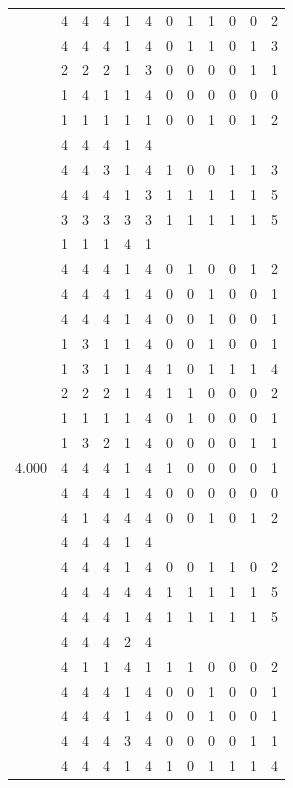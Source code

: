 \documentclass[]{book}
\theoremstyle{definition}
\theoremstyle{definition}
\theoremstyle{definition}
\theoremstyle{remark}
\begin{document}
\begin{table}
{\begin{tabular}[t]{rrrrrrrrrrrr}
 & 4 & 4 & 4 & 1 & 4 & 0 & 1 & 1 & 0 & 0 & 2\\
 & 4 & 4 & 4 & 1 & 4 & 0 & 1 & 1 & 0 & 1 & 3\\
 & 2 & 2 & 2 & 1 & 3 & 0 & 0 & 0 & 0 & 1 & 1\\
 & 1 & 4 & 1 & 1 & 4 & 0 & 0 & 0 & 0 & 0 & 0\\
 & 1 & 1 & 1 & 1 & 1 & 0 & 0 & 1 & 0 & 1 & 2\\
 & 4 & 4 & 4 & 1 & 4 &  &  &  &  &  & \\
 & 4 & 4 & 3 & 1 & 4 & 1 & 0 & 0 & 1 & 1 & 3\\
 & 4 & 4 & 4 & 1 & 3 & 1 & 1 & 1 & 1 & 1 & 5\\
 & 3 & 3 & 3 & 3 & 3 & 1 & 1 & 1 & 1 & 1 & 5\\
 & 1 & 1 & 1 & 4 & 1 &  &  &  &  &  & \\
 & 4 & 4 & 4 & 1 & 4 & 0 & 1 & 0 & 0 & 1 & 2\\
 & 4 & 4 & 4 & 1 & 4 & 0 & 0 & 1 & 0 & 0 & 1\\
 & 4 & 4 & 4 & 1 & 4 & 0 & 0 & 1 & 0 & 0 & 1\\
 & 1 & 3 & 1 & 1 & 4 & 0 & 0 & 1 & 0 & 0 & 1\\
 & 1 & 3 & 1 & 1 & 4 & 1 & 0 & 1 & 1 & 1 & 4\\
 & 2 & 2 & 2 & 1 & 4 & 1 & 1 & 0 & 0 & 0 & 2\\
 & 1 & 1 & 1 & 1 & 4 & 0 & 1 & 0 & 0 & 0 & 1\\
 & 1 & 3 & 2 & 1 & 4 & 0 & 0 & 0 & 0 & 1 & 1\\
4.000 & 4 & 4 & 4 & 1 & 4 & 1 & 0 & 0 & 0 & 0 & 1\\
 & 4 & 4 & 4 & 1 & 4 & 0 & 0 & 0 & 0 & 0 & 0\\
 & 4 & 1 & 4 & 4 & 4 & 0 & 0 & 1 & 0 & 1 & 2\\
 & 4 & 4 & 4 & 1 & 4 &  &  &  &  &  & \\
 & 4 & 4 & 4 & 1 & 4 & 0 & 0 & 1 & 1 & 0 & 2\\
 & 4 & 4 & 4 & 4 & 4 & 1 & 1 & 1 & 1 & 1 & 5\\
 & 4 & 4 & 4 & 1 & 4 & 1 & 1 & 1 & 1 & 1 & 5\\
 & 4 & 4 & 4 & 2 & 4 &  &  &  &  &  & \\
 & 4 & 1 & 1 & 4 & 1 & 1 & 1 & 0 & 0 & 0 & 2\\
 & 4 & 4 & 4 & 1 & 4 & 0 & 0 & 1 & 0 & 0 & 1\\
 & 4 & 4 & 4 & 1 & 4 & 0 & 0 & 1 & 0 & 0 & 1\\
 & 4 & 4 & 4 & 3 & 4 & 0 & 0 & 0 & 0 & 1 & 1\\
 & 4 & 4 & 4 & 1 & 4 & 1 & 0 & 1 & 1 & 1 & 4\\

\end{tabular}}
\end{table}
\end{document}
